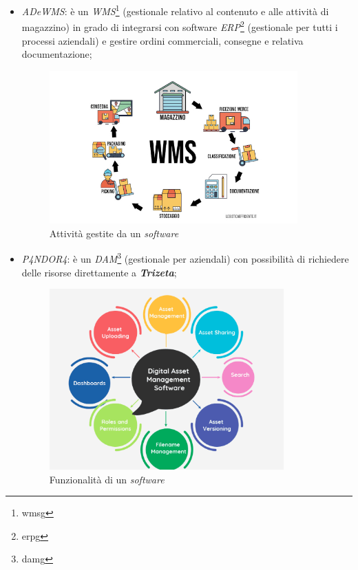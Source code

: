\begin{itemize}
    \item \textit{ADeWMS}: è un \textit{WMS}\footnote{\gls{wmsg}} (gestionale relativo al contenuto e alle attività di magazzino) in grado di integrarsi con software \textit{ERP}\footnote{\gls{erpg}} (gestionale per tutti i processi aziendali) e gestire ordini commerciali, consegne e relativa documentazione;
    \begin{figure}[H]
        \centering
        \includegraphics[width=0.9\textwidth]{images/wms.jpg}
        \caption[Funzionalità di un \textit{software WMS}]{Attività gestite da un \textit{software } \footnotemark}
    \end{figure}
    {}
    
    \item \textit{P4NDOR4}: è un \textit{DAM}\footnote{\gls{damg}} (gestionale per  aziendali) con possibilità di richiedere delle risorse direttamente a \textit{\textbf{Trizeta}};
    \begin{figure}[H]
        \centering
        \includegraphics[width=0.85\textwidth]{images/dam.png}
        \caption[Funzionalità di un \textit{software DAM}]{Funzionalità di un \textit{software } \footnotemark}
    \end{figure}
    {}


\end{itemize}
